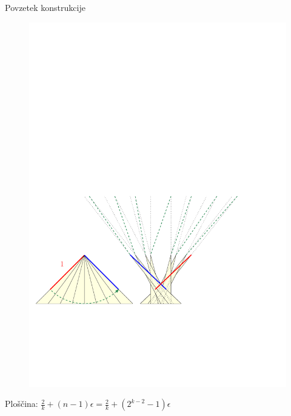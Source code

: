 \documentclass{beamer}
\begin{document}
\begin{frame}{Povzetek konstrukcije}
    \begin{figure}
        \centering
        \includegraphics[width=\textwidth]{ipe_slike/prehod_drevo1.pdf}
    \end{figure}
    \pause
    Ploščina: $ \frac{2}{k} + (n-1) \epsilon = \frac{2}{k} + (2^{k-2} - 1) \epsilon $
\end{frame}

\end{document}
